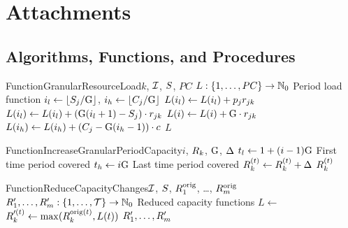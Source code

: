 \chapter{Attachments} \label{chap:attachments}

\section{Algorithms, Functions, and Procedures} \label{sec:attachments/algorithms-functions-procedures}


\begin{alg}{Function}{GranularResourceLoad}{$k$, $\mathcal{I}$, $S$, $PC$} \label{alg:granular-resource-load}
\State $L : \{{1}, \dots, {PC}\} \to \mathbb{N}_0$
       \Comment Period load function
    \State $i_l \gets \lfloor S_{j} / \mathrm{G} \rfloor$,
    \State $i_h \gets \lfloor C_{j} / \mathrm{G} \rfloor$
        \State $L(i_l) \gets L(i_l) + p_{j} r_{j k}$
    \Else
        \State $L(i_l) \gets L(i_l) + (\mathrm{G} (i_l + 1) - S_{j}) \cdot r_{j k}$
            \State $L(i) \gets L(i) + \mathrm{G} \cdot r_{j k}$
        \EndFor
        \State $L(i_h) \gets L(i_h) + (C_{j} - \mathrm{G} (i_h - 1)) \cdot c$
    \EndIf
\EndFor
\State \Return $L$
\end{alg}


\begin{alg}{Function}{IncreaseGranularPeriodCapacity}{$i$, $R_{k}$, $\mathrm{G}$, $\Delta$} \label{alg:increase-granular-period-capacity}
\State $t_l \gets 1+ (i-1)\mathrm{G}$
       \Comment First time period covered
\State $t_h \gets i \mathrm{G}$
       \Comment Last time period covered
    \State $\capacity{k}{t} \gets \capacity{k}{t} + \algImprovement$
\EndFor
\State \Return $\capacity{k}{t}$
\end{alg}


\begin{alg}{Function}{ReduceCapacityChanges}{$\mathcal{I}$, $S$, $R_{1}^\text{orig}$, \dots, $R_{m}^\text{orig}$} \label{alg:reduce-capacity-changes}
\State $R_{1}^\prime, \dots, R_{m}^\prime: \{{1}, \dots, {\mathcal{T}}\} \to \mathbb{N}_0$
       \Comment Reduced capacity functions
    \State $L \gets $ 
        \State $\capacity{k}{t}^\prime \gets \max(\capacity{k}{t}^{\text{orig}}, L(t))$
    \EndFor
\EndFor
\State \Return $R_{1}^\prime, \dots, R_{m}^\prime$
\end{alg}



